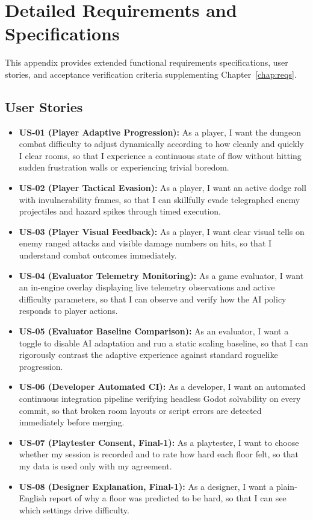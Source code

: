 \chapter{Detailed Requirements and Specifications}
\label{app:reqs}

This appendix provides extended functional requirements specifications, user stories, and acceptance verification criteria supplementing Chapter~\ref{chap:reqs}.

\section{User Stories}
\begin{itemize}
    \item \textbf{US-01 (Player Adaptive Progression):} As a player, I want the dungeon combat difficulty to adjust dynamically according to how cleanly and quickly I clear rooms, so that I experience a continuous state of flow without hitting sudden frustration walls or experiencing trivial boredom.
    \item \textbf{US-02 (Player Tactical Evasion):} As a player, I want an active dodge roll with invulnerability frames, so that I can skillfully evade telegraphed enemy projectiles and hazard spikes through timed execution.
    \item \textbf{US-03 (Player Visual Feedback):} As a player, I want clear visual tells on enemy ranged attacks and visible damage numbers on hits, so that I understand combat outcomes immediately.
    \item \textbf{US-04 (Evaluator Telemetry Monitoring):} As a game evaluator, I want an in-engine overlay displaying live telemetry observations and active difficulty parameters, so that I can observe and verify how the AI policy responds to player actions.
    \item \textbf{US-05 (Evaluator Baseline Comparison):} As an evaluator, I want a toggle to disable AI adaptation and run a static scaling baseline, so that I can rigorously contrast the adaptive experience against standard roguelike progression.
    \item \textbf{US-06 (Developer Automated CI):} As a developer, I want an automated continuous integration pipeline verifying headless Godot solvability on every commit, so that broken room layouts or script errors are detected immediately before merging.
    \item \textbf{US-07 (Playtester Consent, Final-1):} As a playtester, I want to choose whether my session is recorded and to rate how hard each floor felt, so that my data is used only with my agreement.
    \item \textbf{US-08 (Designer Explanation, Final-1):} As a designer, I want a plain-English report of why a floor was predicted to be hard, so that I can see which settings drive difficulty.
\end{itemize}

